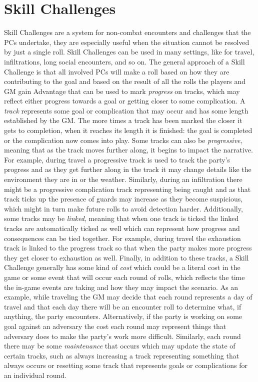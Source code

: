 \section{Skill Challenges}
Skill Challenges are a system for non-combat encounters and challenges that the PCs undertake, they are especially useful when the situation cannot be resolved by just a single roll.
Skill Challenges can be used in many settings, like for travel, infiltrations, long social encounters, and so on.
The general approach of a Skill Challenge is that all involved PCs will make a roll based on how they are contributing to the goal and based on the result of all the rolls the players and GM gain Advantage that can be used to mark \emph{progress} on tracks, which may reflect either progress towards a goal or getting closer to some complication.
A \emph{track} represents some goal or complication that may occur and has some length established by the GM.
The more times a track has been marked the closer it gets to completion, when it reaches its length it is finished: the goal is completed or the complication now comes into play.
Some tracks can also be \emph{progressive}, meaning that as the track moves further along, it begins to impact the narrative.
For example, during travel a progressive track is used to track the party's progress and as they get further along in the track it may change details like the environment they are in or the weather.
Similarly, during an infiltration there might be a progressive complication track representing being caught and as that track ticks up the presence of guards may increase as they become suspicious, which might in turn make future rolls to avoid detection harder.
Additionally, some tracks may be \emph{linked}, meaning that when one track is ticked the linked tracks are automatically ticked as well which can represent how progress and consequences can be tied together.
For example, during travel the exhaustion track is linked to the progress track so that when the party makes more progress they get closer to exhaustion as well.
Finally, in addition to these tracks, a Skill Challenge generally has some kind of \emph{cost} which could be a literal cost in the game or some event that will occur each round of rolls, which reflects the time the in-game events are taking and how they may impact the scenario.
As an example, while traveling the GM may decide that each round represents a day of travel and that each day there will be an encounter roll to determine what, if anything, the party encounters.
Alternatively, if the party is working on some goal against an adversary the cost each round may represent things that adversary does to make the party's work more difficult.
Similarly, each round there may be some \emph{maintenance} that occurs which may update the state of certain tracks, such as always increasing a track representing something that always occurs or resetting some track that represents goals or complications for an individual round.

